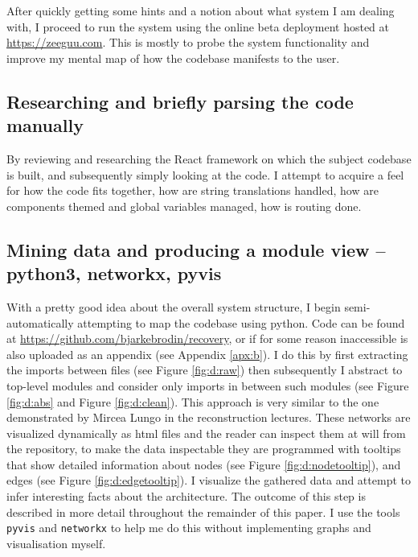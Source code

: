 \documentclass{article}
\begin{document}
After quickly getting some hints and a notion about what system I am dealing with,
I proceed to run the system using the online beta deployment hosted at \href{https://zeeguu.com}{https://zeeguu.com}.
This is mostly to probe the system functionality and improve my mental map of how the codebase manifests to the user.

\subsection{Researching and briefly parsing the code manually}

By reviewing and researching the React framework on which the subject codebase is built,
and subsequently simply looking at the code. 
I attempt to acquire a feel for how the code fits together,
how are string translations handled,
how are components themed and global variables managed,
how is routing done.

\subsection{Mining data and producing a module view -- python3, networkx, pyvis}
\label{mining}

With a pretty good idea about the overall system structure,
I begin semi-automatically attempting to map the codebase using python.
Code can be found at \href{https://github.com/bjarkebrodin/recovery}{https://github.com/bjarkebrodin/recovery},
or if for some reason inaccessible is also uploaded as an appendix (see Appendix \ref{apx:b}).
I do this by first extracting the imports between files (see Figure \ref{fig:d:raw})
then subsequently I abstract to top-level modules and consider only imports in between such modules (see Figure \ref{fig:d:abs} and Figure \ref{fig:d:clean}).
This approach is very similar to the one demonstrated by Mircea Lungo in the reconstruction lectures\cite{reconstruction}.
These networks are visualized dynamically as html files and the reader can inspect them at will from the repository,
to make the data inspectable they are programmed with tooltips that show detailed information about nodes (see Figure \ref{fig:d:nodetooltip}), and edges (see Figure \ref{fig:d:edgetooltip}).
I visualize the gathered data and attempt to infer interesting facts about the architecture.
The outcome of this step is described in more detail throughout the remainder of this paper.
I use the tools \verb|pyvis|\cite{pyvis} and \verb|networkx|\cite{networkx} to help me do this without implementing graphs and visualisation myself.
\end{document}
